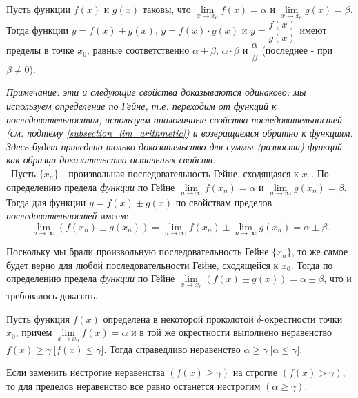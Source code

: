 
\begin{theorem}
Пусть функции \(f(x)\) и \(g(x)\) таковы, что \(\lim\limits_{x \to x_{0}}f(x) = \alpha\)
и \(\lim\limits_{x \to x_{0}} g(x) = \beta\). Тогда функции \(y = f(x) \pm g(x)\),
\(y=f(x)\cdot g(x)\) и \(y=\dfrac{f(x)}{g(x)}\) имеют пределы в точке \(x_{0}\),
равные соответственно \(\alpha \pm \beta\), \(\alpha \cdot \beta\) и \(\dfrac{\alpha}{\beta}\)
(последнее - при \(\beta \neq 0\)).

\vspace{3mm}

\textit{Примечание: эти и следующие свойства доказываются одинаково: мы используем определение
по Гейне, т.е. переходим от функций к последовательностям, используем аналогичные свойства
последовательностей (см. подтему \ref{subsection_lim_arithmetic}) и возвращаемся обратно к функциям. Здесь будет приведено
только доказательство для суммы (разности) функций как образца доказательства остальных свойств.} \\

\proofname~Пусть \(\{x_{n}\}\) - произвольная последовательность Гейне, сходящаяся к \(x_{0}\).
По определению предела \textit{функции} по Гейне
\(\lim\limits_{n \to \infty}{f(x_{n})} = \alpha\) и
\(\lim\limits_{n \to \infty}{g(x_{n})} = \beta\). Тогда для функции \(y = f(x) \pm g(x)\)
по свойствам пределов \textit{последовательностей} имеем:
\[
\lim_{ n \to \infty }(f(x_{n}) \pm g(x_{n})) = \lim_{ n \to \infty } f(x_{n}) \pm
\lim_{ n \to \infty } g(x_{n}) = \alpha \pm \beta.
\]

Поскольку мы брали произвольную последовательность Гейне \(\{x_{n}\}\), то же самое
будет верно для любой последовательности Гейне, сходящейся к \(x_{0}\).
Тогда по определению предела \textit{функции} по Гейне
\(\lim\limits_{x \to x_{0}}{(f(x) \pm g(x))} = \alpha \pm \beta\),
что и требовалось доказать.~\qedsymbol
\end{theorem}

\begin{theorem}
Пусть функция \(f(x)\) определена в некоторой проколотой \(\delta\)-окрестности
точки \(x_{0}\), причем \(\lim\limits_{x \to x_{0}} f(x) = \alpha\) и в той же окрестности
выполнено неравенство \({f(x) \geq \gamma ~ \Big[ f(x) \leq \gamma \Big]}\). Тогда справедливо
неравенство \(\alpha \geq \gamma ~ \Big[ \alpha \leq \gamma \Big]\).
\end{theorem}

\begin{note}
Если заменить нестрогие неравенства \((f(x) \geq \gamma)\) на строгие \((f(x) > \gamma)\),
то для пределов неравенство все равно останется нестрогим \((\alpha \geq \gamma)\).
\end{note}


